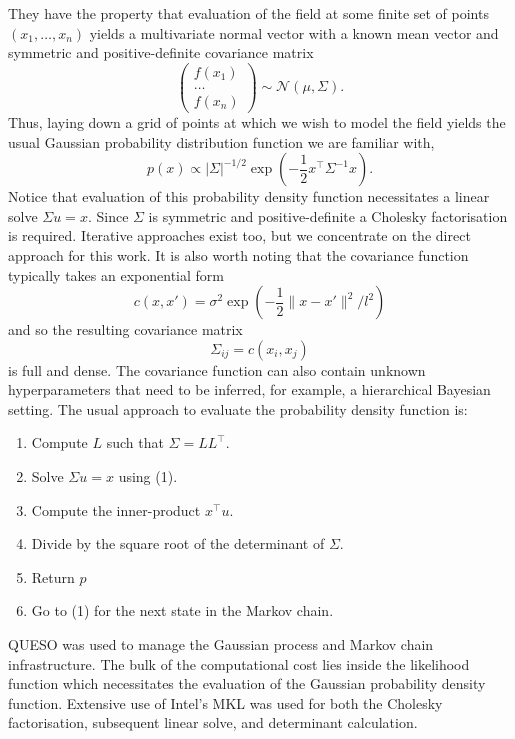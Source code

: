 They have the property that evaluation of the field at some finite set of
points $(x_1, \ldots, x_n)$ yields a multivariate normal vector with a known
mean vector and symmetric and positive-definite covariance matrix
\begin{equation}
  \begin{pmatrix}
    f(x_1) \\
    \hdots \\
    f(x_n)
  \end{pmatrix}
  \sim \mathcal{N}(\mu, \Sigma).
\end{equation}
Thus, laying down a grid of points at which we wish to model the field yields
the usual Gaussian probability distribution function we are familiar with,
\begin{equation}
  p(x) \propto |\Sigma|^{-1/2} \exp(-\frac12 x^\top \Sigma^{-1} x).
\end{equation}
Notice that evaluation of this probability density function necessitates a
linear solve $\Sigma u = x$.  Since $\Sigma$ is symmetric and positive-definite
a Cholesky factorisation is required.  Iterative approaches exist too, but we
concentrate on the direct approach for this work.  It is also worth noting that the
covariance function typically takes an exponential form
\begin{equation}
  c(x, x') = \sigma^2 \exp(-\frac12 \| x - x' \|^2 / l^2)
\end{equation}
and so the resulting covariance matrix
\begin{equation}
  \Sigma_{ij} = c(x_i, x_j)
\end{equation}
is full and dense.  The covariance function can also contain
unknown hyperparameters
that need to be inferred, for example, a hierarchical
Bayesian setting.  The usual approach to evaluate the
probability density function is:
\begin{enumerate}
  \item Compute $L$ such that $\Sigma = LL^\top$.
  \item Solve $\Sigma u = x$ using (1).
  \item Compute the inner-product $x^\top u$.
  \item Divide by the square root of the determinant of $\Sigma$.
  \item Return $p$
  \item Go to (1) for the next state in the Markov chain.
\end{enumerate}

QUESO was used to manage the Gaussian process and Markov chain infrastructure.
The bulk of the computational cost lies inside the likelihood function which
necessitates the evaluation of the Gaussian probability density function.
Extensive use of Intel's MKL was used for both the Cholesky factorisation,
subsequent linear solve, and determinant calculation.


